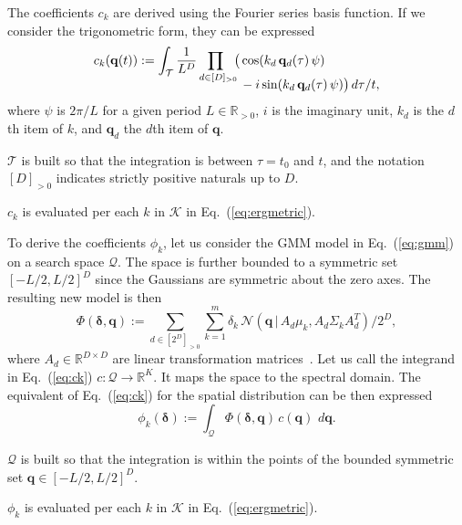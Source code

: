 \documentclass[lettersize,journal,twoside]{IEEEtran}
\theoremstyle{definition}
\begin{document}
The coefficients $c_k$ are derived using the Fourier series basis function. If we consider the trigonometric form, they can be expressed
\begin{equation}\label{eq:ck}
  \begin{split}
    c_k(\mathbf{q}(t)):=\int_{\mathcal{T}}\frac{1}{L^D}\prod_{d\in[D]_{>0}\hspace*{-1ex}}\big(& \cos(k_d\,\mathbf{q}_d(\tau)\,\psi)\\[-2ex]
    &\vspace*{-4ex}-i\sin(k_d\,\mathbf{q}_d(\tau)\,\psi) \big)\,d\tau/t,
  \end{split}
\end{equation}
where $\psi$ is $2\pi/L$ for a given period $L\in\mathbb{R}_{>0}$, $i$ is the imaginary unit, $k_d$ is the $d$th item of $k$, and $\mathbf{q}_d$ the $d$th item of $\mathbf{q}$.

$\mathcal{T}$ is built so that the integration is between $\tau=t_0$ and $t$, and the notation $[D]_{>0}$ indicates strictly positive naturals up to $D$.

$c_k$ is evaluated per each $k$ in $\mathcal{K}$ in Eq.~(\ref{eq:ergmetric}).

To derive the coefficients $\phi_k$, let us consider the GMM model in Eq.~(\ref{eq:gmm}) on a search space $\mathcal{Q}$. The space is further bounded to a symmetric set $[-L/2,L/2]^D$ since the Gaussians are symmetric about the zero axes. The resulting new model is then
\begin{equation}
  \Phi(\boldsymbol{\delta},\mathbf{q}):=\sum_{d\in[2^D]_{>0}}\sum_{k=1}^{m}\delta_k\,\mathcal{N}(\mathbf{q}\,|\,A_d\mu_k,A_d\Sigma_k A_d^T)/2^D,
\end{equation}
where $A_d\in\mathbb{R}^{D\times D}$ are linear transformation matrices~\cite{calinon2020mixture}. Let us call the integrand in Eq.~(\ref{eq:ck}) $c:\mathcal{Q}\longrightarrow \mathbb{R}^K$. It maps the space to the spectral domain. The equivalent of Eq.~(\ref{eq:ck}) for the spatial distribution can be then expressed
\begin{equation}\label{eq:phik}
  \phi_k(\boldsymbol{\delta}):=\int_{\mathcal{Q}} \Phi(\boldsymbol{\delta},\mathbf{q})\,c(\mathbf{q})\,\,d\mathbf{q}.
\end{equation}

$\mathcal{Q}$ is built so that the integration is within the points of the bounded symmetric set $\mathbf{q}\in[-L/2,L/2]^D$.

$\phi_k$ is evaluated per each $k$ in $\mathcal{K}$ in Eq.~(\ref{eq:ergmetric}).
\end{document}
